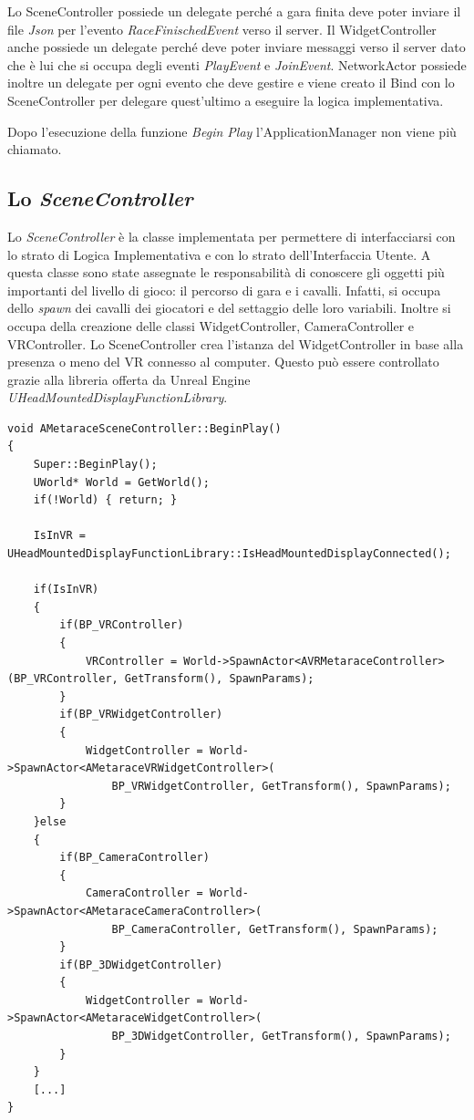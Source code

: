     Lo SceneController possiede un delegate perché a gara finita deve poter inviare il file \textit{Json} per l'evento \textit{RaceFinischedEvent} verso il server.
    Il WidgetController anche possiede un delegate perché deve poter inviare messaggi verso il server dato che è lui che si occupa degli eventi \textit{PlayEvent} e \textit{JoinEvent}.
    NetworkActor possiede inoltre un delegate per ogni evento che deve gestire e viene creato il Bind con lo SceneController per delegare quest'ultimo a eseguire la logica implementativa.

    Dopo l'esecuzione della funzione \textit{Begin Play} l'ApplicationManager non viene più chiamato.

    \subsection{Lo \textit{SceneController}}

    Lo \textit{SceneController} è la classe implementata per permettere di interfacciarsi con lo strato di Logica Implementativa e con lo strato dell'Interfaccia Utente.
    A questa classe sono state assegnate le responsabilità di conoscere gli oggetti più importanti del livello di gioco: il percorso di gara e i cavalli. 
    Infatti, si occupa dello \textit{spawn} dei cavalli dei giocatori e del settaggio delle loro variabili.
    Inoltre si occupa della creazione delle classi WidgetController, CameraController e VRController.
    Lo SceneController crea l'istanza del WidgetController in base alla presenza o meno del VR connesso al computer.
    Questo può essere controllato grazie alla libreria offerta da Unreal Engine \textit{UHeadMountedDisplayFunctionLibrary}.

    \begin{lstlisting}[caption = Sezione del source della classe SceneController dove viene fatto il controllo per sapere se il giocatore indossa un visore]
void AMetaraceSceneController::BeginPlay()
{
    Super::BeginPlay();
    UWorld* World = GetWorld();
    if(!World) { return; }

    IsInVR = UHeadMountedDisplayFunctionLibrary::IsHeadMountedDisplayConnected();

    if(IsInVR)
	{
		if(BP_VRController)
		{
			VRController = World->SpawnActor<AVRMetaraceController>(BP_VRController, GetTransform(), SpawnParams);
		}
		if(BP_VRWidgetController)
		{
			WidgetController = World->SpawnActor<AMetaraceVRWidgetController>(
				BP_VRWidgetController, GetTransform(), SpawnParams);
		}
    }else
    {
        if(BP_CameraController)
		{
			CameraController = World->SpawnActor<AMetaraceCameraController>(
				BP_CameraController, GetTransform(), SpawnParams);
		}
		if(BP_3DWidgetController)
		{
			WidgetController = World->SpawnActor<AMetaraceWidgetController>(
				BP_3DWidgetController, GetTransform(), SpawnParams);
		}
    }
    [...]
}        
    \end{lstlisting}

